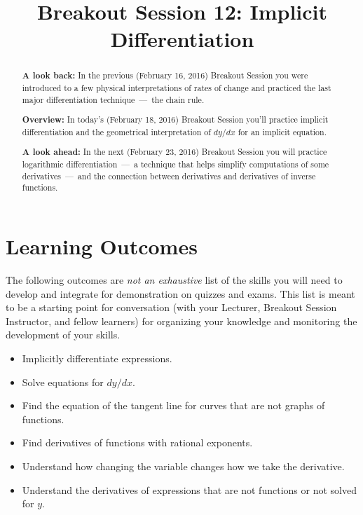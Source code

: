 \documentclass[handout,nooutcomes]{ximera}
\title{Breakout Session 12: Implicit Differentiation}
\begin{document}
\begin{abstract}
  \textbf{A look back:} In the previous (February 16, 2016) Breakout Session you were introduced to a few physical interpretations of rates of change and practiced the last major differentiation technique~---~the chain rule.

  \textbf{Overview:} In today's (February 18, 2016) Breakout Session you'll practice implicit differentiation and the geometrical interpretation of $dy/dx$ for an implicit equation.

  \textbf{A look ahead:} In the next (February 23, 2016) Breakout Session you will practice logarithmic differentiation~---~a technique that helps simplify computations of some derivatives~---~and the connection between derivatives and derivatives of inverse functions.
\end{abstract}
\maketitle

\section{Learning Outcomes}
\label{section:learning-outcomes}
The following outcomes are \emph{not an exhaustive} list of the skills you will need to develop and integrate for demonstration on quizzes and exams.
This list is meant to be a starting point for conversation (with your Lecturer, Breakout Session Instructor, and fellow learners) for organizing your knowledge and monitoring the development of your skills.

\begin{itemize}
  \item 
    Implicitly differentiate expressions. 

  \item
    Solve equations for $dy/dx$.

  \item
    Find the equation of the tangent line for curves that are not graphs of functions.

  \item
    Find derivatives of functions with rational exponents. 

  \item 
    Understand how changing the variable changes how we take the derivative.

  \item 
    Understand the derivatives of expressions that are not functions or not solved for $y$.  
\end{itemize}
\newpage
\end{document}
